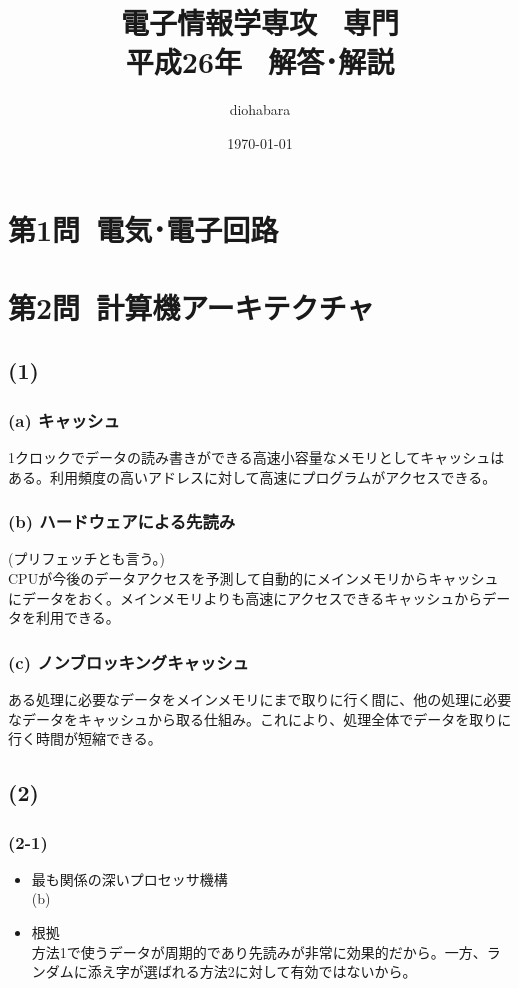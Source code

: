 \documentclass[a4paper,12pt,xelatex,ja=standard]{bxjsarticle}
\title{電子情報学専攻 \, 専門 \\ 平成26年 \, 解答･解説}
\author{diohabara}
\date{\today}
\begin{document}
\maketitle

\section*{第1問\ 電気･電子回路}

\section*{第2問\ 計算機アーキテクチャ}
\subsection*{(1)}
\subsubsection*{(a) キャッシュ}
1クロックでデータの読み書きができる高速小容量なメモリとしてキャッシュはある。利用頻度の高いアドレスに対して高速にプログラムがアクセスできる。

\subsubsection*{(b) ハードウェアによる先読み}
(プリフェッチとも言う。)\\
CPUが今後のデータアクセスを予測して自動的にメインメモリからキャッシュにデータをおく。メインメモリよりも高速にアクセスできるキャッシュからデータを利用できる。

\subsubsection*{(c) ノンブロッキングキャッシュ}
ある処理に必要なデータをメインメモリにまで取りに行く間に、他の処理に必要なデータをキャッシュから取る仕組み。これにより、処理全体でデータを取りに行く時間が短縮できる。

\subsection*{(2)}
\subsubsection*{(2-1)}
\begin{itemize}
  \item{最も関係の深いプロセッサ機構}
  \\
  (b)
  \item{根拠}
  \\
  方法1で使うデータが周期的であり先読みが非常に効果的だから。一方、ランダムに添え字が選ばれる方法2に対して有効ではないから。
\end{itemize}
\end{document}
